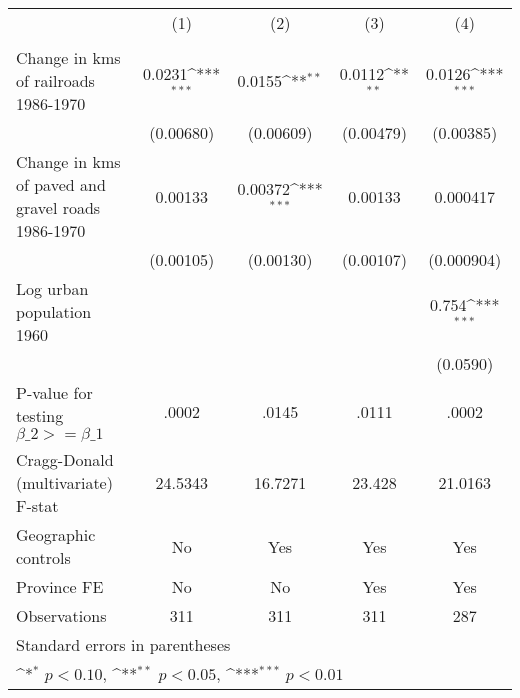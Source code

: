 {
\def\sym#1{\ifmmode^{#1}\else\(^{#1}\)\fi}
\begin{tabular}{l*{4}{c}}
\hline\hline
                &\multicolumn{1}{c}{(1)}&\multicolumn{1}{c}{(2)}&\multicolumn{1}{c}{(3)}&\multicolumn{1}{c}{(4)}\\
                &\multicolumn{1}{c}{}&\multicolumn{1}{c}{}&\multicolumn{1}{c}{}&\multicolumn{1}{c}{}\\
\hline
Change in kms of railroads 1986-1970&   0.0231\sym{***}&   0.0155\sym{**} &   0.0112\sym{**} &   0.0126\sym{***}\\
                &(0.00680)         &(0.00609)         &(0.00479)         &(0.00385)         \\
[1em]
Change in kms of paved and gravel roads 1986-1970&  0.00133         &  0.00372\sym{***}&  0.00133         & 0.000417         \\
                &(0.00105)         &(0.00130)         &(0.00107)         &(0.000904)         \\
[1em]
Log urban population 1960&                  &                  &                  &    0.754\sym{***}\\
                &                  &                  &                  & (0.0590)         \\
\hline
P-value for testing $\beta\_{2} >= \beta\_{1}$&    .0002         &    .0145         &    .0111         &    .0002         \\
Cragg-Donald (multivariate) F-stat&  24.5343         &  16.7271         &   23.428         &  21.0163         \\
Geographic controls&       No         &      Yes         &      Yes         &      Yes         \\
Province FE     &       No         &       No         &      Yes         &      Yes         \\
Observations    &      311         &      311         &      311         &      287         \\
\hline\hline
\multicolumn{5}{l}{\footnotesize Standard errors in parentheses}\\
\multicolumn{5}{l}{\footnotesize \sym{*} \(p<0.10\), \sym{**} \(p<0.05\), \sym{***} \(p<0.01\)}\\
\end{tabular}
}
